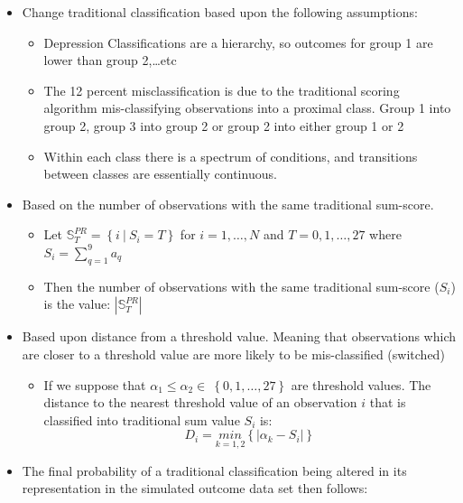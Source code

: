 \documentclass[12pt,]{article}
\providecommand{\tightlist}{%
  \setlength{\itemsep}{0pt}\setlength{\parskip}{0pt}}
\begin{document}
\begin{itemize}
\tightlist
\item
  Change traditional classification based upon the following
  assumptions:

  \begin{itemize}
  \tightlist
  \item
    Depression Classifications are a hierarchy, so outcomes for group 1
    are lower than group 2,\ldots{}etc
  \item
    The 12 percent misclassification is due to the traditional scoring
    algorithm mis-classifying observations into a proximal class. Group
    1 into group 2, group 3 into group 2 or group 2 into either group 1
    or 2
  \item
    Within each class there is a spectrum of conditions, and transitions
    between classes are essentially continuous.
  \end{itemize}
\item
  Based on the number of observations with the same traditional
  sum-score.

  \begin{itemize}
  \tightlist
  \item
    Let \(\mathbb{S}^{PR}_{T}=\left \{ i\ \Big | \ S_{i}=T \right \}\)
    for \(i=1,\ldots, N\) and \(T=0, 1,\ldots, 27\) where
    \(S_{i} = \sum_{q=1}^{9} a_{q}\)
  \item
    Then the number of observations with the same traditional sum-score
    (\(S_{i}\)) is the value: \(|\mathbb{S}^{PR}_{T}|\)
  \end{itemize}
\item
  Based upon distance from a threshold value. Meaning that observations
  which are closer to a threshold value are more likely to be
  mis-classified (switched)

  \begin{itemize}
  \tightlist
  \item
    If we suppose that
    \(\alpha_{1} \leq \alpha_{2} \in \ \left \{ 0,1,\ldots, 27 \right \}\)
    are threshold values. The distance to the nearest threshold value of
    an observation \(i\) that is classified into traditional sum value
    \(S_{i}\) is:
    \[D_{i} = \underset{k=1,2}{min}\left \{ \Big | \alpha_{k}-S_{i}   \Big | \right \}\]
  \end{itemize}
\item
  The final probability of a traditional classification being altered in
  its representation in the simulated outcome data set then follows:


\end{itemize}
\end{document}
